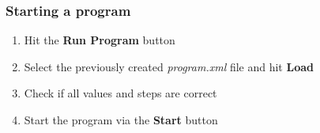\documentclass{article}
\newcounter{ListCounter}
\begin{document}
	\subsubsection{Starting a program}
\begin{enumerate}
\setcounter{enumi}{\value{ListCounter}}
\item Hit the \textbf{Run Program} button
\item Select the previously created \textit{program.xml} file and hit \textbf{Load}
\item Check if all values and steps are correct
\item Start the program via the \textbf{Start} button
\end{enumerate}
\end{document}
